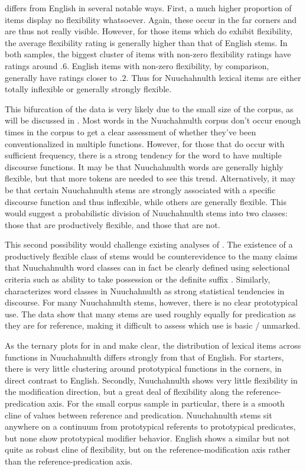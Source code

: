  differs from English in several notable ways. First, a much higher proportion of items display no flexibility whatsoever. Again, these occur in the far corners and are thus not really visible. However, for those items which do exhibit flexibility, the average flexibility rating is generally higher than that of English stems. In both samples, the biggest cluster of items with non-zero flexibility ratings have ratings around $.6$. English items with non-zero flexibility, by comparison, generally have ratings closer to $.2$. Thus for Nuuchahnulth lexical items are either totally inflexible or generally strongly flexible.

This bifurcation of the data is very likely due to the small size of the  corpus, as will be discussed in . Most words in the Nuuchahnulth corpus don't occur enough times in the corpus to get a clear assessment of whether they've been conventionalized in multiple functions. However, for those that do occur with sufficient frequency, there is a strong tendency for the word to have multiple discourse functions. It may be that Nuuchahnulth words are generally highly flexible, but that more tokens are needed to see this trend. Alternatively, it may be that certain Nuuchahnulth stems are strongly associated with a specific discourse function and thus inflexible, while others are generally flexible. This would suggest a probabilistic division of Nuuchahnulth stems into two classes: those that are productively flexible, and those that are not.

This second possibility would challenge existing analyses of . The existence of a productively flexible class of stems would be counterevidence to the many claims that Nuuchahnulth word classes can in fact be clearly defined using selectional criteria such as ability to take possession or the definite suffix \parencites{Jacobsen1979}{DavisGillonMatthewson2014}{Braithwaite2015}. Similarly, \textcite[57]{Nakayama2001} characterizes word classes in Nuuchahnulth as strong statistical tendencies in discourse. For many Nuuchahnulth stems, however, there is no clear prototypical use. The data show that many stems are used roughly equally for predication as they are for reference, making it difficult to assess which use is basic / unmarked.

As the ternary plots for  in  and  make clear, the distribution of lexical items across functions in Nuuchahnulth differs strongly from that of English. For starters, there is very little clustering around prototypical functions in the corners, in direct contrast to English. Secondly, Nuuchahnulth shows very little flexibility in the modification direction, but a great deal of flexibility along the reference-predication axis. For the small corpus sample in particular, there is a smooth cline of values between reference and predication. Nuuchahnulth stems sit anywhere on a continuum from prototypical referents to prototypical predicates, but none show prototypical modifier behavior. English shows a similar but not quite as robust cline of flexibility, but on the reference-modification axis rather than the reference-predication axis.

